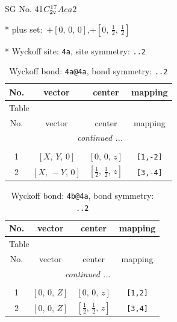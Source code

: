 \documentclass[fleqn,8pt]{jsarticle}
\begin{document}
\setcounter{MaxMatrixCols}{32}

\renewcommand{\tablename}{Table~}
\renewcommand{\figurename}{Figure~}
\begin{center}
\LARGE
SG No. 41\quad$C_{\rm 2v}^{17}$\quad$Aea2$\quad[ orthorhombic ]
\end{center}

* plus set:\,\,\,$+\left[ 0,\, 0,\, 0 \right]$,\quad $+\left[ 0,\, \frac{1}{2},\, \frac{1}{2} \right]$


* Wyckoff site: {\tt 4a}, site symmetry: {\tt ..2}
\renewcommand{\arraystretch}{1.2}
\begin{longtable}{cccc}
\caption{Wyckoff bond: {\tt 4a@4a}, bond symmetry: {\tt ..2}}
 \\
 \hline \hline
No. & vector & center & mapping \\ \hline \endfirsthead

\multicolumn{3}{l}{\tablename\ \thetable{}} \\
 \hline \hline
No. & vector & center & mapping \\ \hline \endhead

 \hline \hline
\multicolumn{3}{r}{\footnotesize\it continued ...} \\ \endfoot

 \hline \hline
\multicolumn{3}{r}{} \\ \endlastfoot

1 & $\left[ X,\, Y,\, 0 \right]$ & $\left[ 0,\, 0,\, z \right]$ & {\tt [1,-2]} \\ \hline
2 & $\left[ X,\, - Y,\, 0 \right]$ & $\left[ \frac{1}{2},\, \frac{1}{2},\, z \right]$ & {\tt [3,-4]} \\
\end{longtable}
\renewcommand{\arraystretch}{1.2}
\begin{longtable}{cccc}
\caption{Wyckoff bond: {\tt 4b@4a}, bond symmetry: {\tt ..2}}
 \\
 \hline \hline
No. & vector & center & mapping \\ \hline \endfirsthead

\multicolumn{3}{l}{\tablename\ \thetable{}} \\
 \hline \hline
No. & vector & center & mapping \\ \hline \endhead

 \hline \hline
\multicolumn{3}{r}{\footnotesize\it continued ...} \\ \endfoot

 \hline \hline
\multicolumn{3}{r}{} \\ \endlastfoot

1 & $\left[ 0,\, 0,\, Z \right]$ & $\left[ 0,\, 0,\, z \right]$ & {\tt [1,2]} \\ \hline
2 & $\left[ 0,\, 0,\, Z \right]$ & $\left[ \frac{1}{2},\, \frac{1}{2},\, z \right]$ & {\tt [3,4]} \\
\end{longtable}
\end{document}
